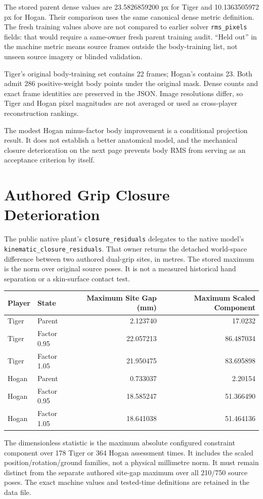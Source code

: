 \documentclass[11pt,letterpaper]{article}
\newcommand{\code}[1]{\nolinkurl{#1}}\newcommand{\hash}[1]{{\footnotesize\nolinkurl{#1}}}
\newcommand{\chapterpage}[1]{\clearpage\section{#1}}
\begin{document}
The stored parent dense values are 23.5826859200 px for Tiger and 10.1363505972 px for Hogan. Their comparison uses the same canonical dense metric definition. The fresh training values above are not compared to earlier solver \code{rms_pixels} fields: that would require a same-owner fresh parent training audit. ``Held out'' in the machine metric means source frames outside the body-training list, not unseen source imagery or blinded validation.

Tiger's original body-training set contains 22 frames; Hogan's contains 23. Both admit 286 positive-weight body points under the original mask. Dense counts and exact frame identities are preserved in the JSON. Image resolutions differ, so Tiger and Hogan pixel magnitudes are not averaged or used as cross-player reconstruction rankings.

The modest Hogan minus-factor body improvement is a conditional projection result. It does not establish a better anatomical model, and the mechanical closure deterioration on the next page prevents body RMS from serving as an acceptance criterion by itself.

\chapterpage{Authored Grip Closure Deterioration}
The public native plant's \code{closure_residuals} delegates to the native model's \code{kinematic_closure_residuals}. That owner returns the detached world-space difference between two authored dual-grip sites, in metres. The stored maximum is the norm over original source poses. It is not a measured historical hand separation or a skin-surface contact test.

\begin{tabular}{@{}llrr@{}}\toprule
Player & State & Maximum Site Gap (mm) & Maximum Scaled Component\\\midrule
Tiger & Parent & 2.123740 & 17.0232\\
Tiger & Factor 0.95 & 22.057213 & 86.487034\\
Tiger & Factor 1.05 & 21.950475 & 83.695898\\
Hogan & Parent & 0.733037 & 2.20154\\
Hogan & Factor 0.95 & 18.585247 & 51.366490\\
Hogan & Factor 1.05 & 18.641038 & 51.464136\\\bottomrule
\end{tabular}

The dimensionless statistic is the maximum absolute configured constraint component over 178 Tiger or 364 Hogan assessment times. It includes the scaled position/rotation/ground families, not a physical millimetre norm. It must remain distinct from the separate authored site-gap maximum over all 210/750 source poses. The exact machine values and tested-time definitions are retained in the data file.
\end{document}
